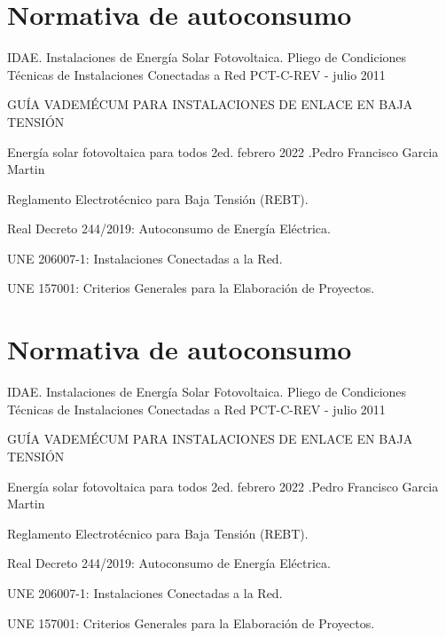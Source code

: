 \documentclass{article}
\begin{document}
\section*{Normativa de autoconsumo}


\begin{thebibliography}{9}
IDAE. 
Instalaciones de
    Energía Solar Fotovoltaica.
    Pliego de Condiciones Técnicas de
    Instalaciones Conectadas a Red
    PCT-C-REV - julio 2011

GUÍA VADEMÉCUM PARA INSTALACIONES DE ENLACE EN BAJA TENSIÓN
    
Energía solar fotovoltaica para todos 2ed. febrero 2022 .Pedro Francisco Garcia Martin  
    
Reglamento Electrotécnico para Baja Tensión (REBT).
    
Real Decreto 244/2019: Autoconsumo de Energía Eléctrica.
    
UNE 206007-1: Instalaciones Conectadas a la Red.
    
UNE 157001: Criterios Generales para la Elaboración de Proyectos.
    
\end{thebibliography}



\section*{Normativa de autoconsumo}


\begin{thebibliography}{9}
IDAE. 
Instalaciones de
    Energía Solar Fotovoltaica.
    Pliego de Condiciones Técnicas de
    Instalaciones Conectadas a Red
    PCT-C-REV - julio 2011

GUÍA VADEMÉCUM PARA INSTALACIONES DE ENLACE EN BAJA TENSIÓN
    
Energía solar fotovoltaica para todos 2ed. febrero 2022 .Pedro Francisco Garcia Martin  
    
Reglamento Electrotécnico para Baja Tensión (REBT).
    
Real Decreto 244/2019: Autoconsumo de Energía Eléctrica.
    
UNE 206007-1: Instalaciones Conectadas a la Red.
    
UNE 157001: Criterios Generales para la Elaboración de Proyectos.
    
\end{thebibliography}
\end{document}
